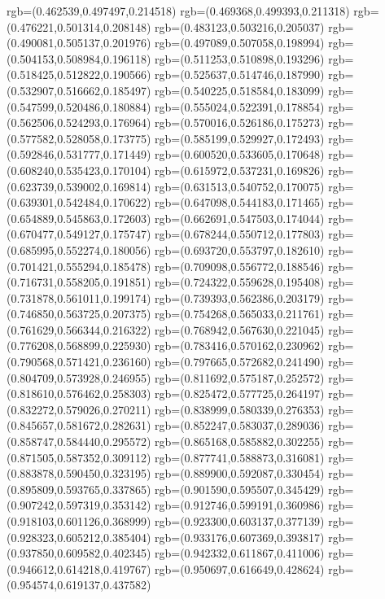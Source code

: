 {{{			rgb=(0.462539,0.497497,0.214518)
			rgb=(0.469368,0.499393,0.211318)
			rgb=(0.476221,0.501314,0.208148)
			rgb=(0.483123,0.503216,0.205037)
			rgb=(0.490081,0.505137,0.201976)
			rgb=(0.497089,0.507058,0.198994)
			rgb=(0.504153,0.508984,0.196118)
			rgb=(0.511253,0.510898,0.193296)
			rgb=(0.518425,0.512822,0.190566)
			rgb=(0.525637,0.514746,0.187990)
			rgb=(0.532907,0.516662,0.185497)
			rgb=(0.540225,0.518584,0.183099)
			rgb=(0.547599,0.520486,0.180884)
			rgb=(0.555024,0.522391,0.178854)
			rgb=(0.562506,0.524293,0.176964)
			rgb=(0.570016,0.526186,0.175273)
			rgb=(0.577582,0.528058,0.173775)
			rgb=(0.585199,0.529927,0.172493)
			rgb=(0.592846,0.531777,0.171449)
			rgb=(0.600520,0.533605,0.170648)
			rgb=(0.608240,0.535423,0.170104)
			rgb=(0.615972,0.537231,0.169826)
			rgb=(0.623739,0.539002,0.169814)
			rgb=(0.631513,0.540752,0.170075)
			rgb=(0.639301,0.542484,0.170622)
			rgb=(0.647098,0.544183,0.171465)
			rgb=(0.654889,0.545863,0.172603)
			rgb=(0.662691,0.547503,0.174044)
			rgb=(0.670477,0.549127,0.175747)
			rgb=(0.678244,0.550712,0.177803)
			rgb=(0.685995,0.552274,0.180056)
			rgb=(0.693720,0.553797,0.182610)
			rgb=(0.701421,0.555294,0.185478)
			rgb=(0.709098,0.556772,0.188546)
			rgb=(0.716731,0.558205,0.191851)
			rgb=(0.724322,0.559628,0.195408)
			rgb=(0.731878,0.561011,0.199174)
			rgb=(0.739393,0.562386,0.203179)
			rgb=(0.746850,0.563725,0.207375)
			rgb=(0.754268,0.565033,0.211761)
			rgb=(0.761629,0.566344,0.216322)
			rgb=(0.768942,0.567630,0.221045)
			rgb=(0.776208,0.568899,0.225930)
			rgb=(0.783416,0.570162,0.230962)
			rgb=(0.790568,0.571421,0.236160)
			rgb=(0.797665,0.572682,0.241490)
			rgb=(0.804709,0.573928,0.246955)
			rgb=(0.811692,0.575187,0.252572)
			rgb=(0.818610,0.576462,0.258303)
			rgb=(0.825472,0.577725,0.264197)
			rgb=(0.832272,0.579026,0.270211)
			rgb=(0.838999,0.580339,0.276353)
			rgb=(0.845657,0.581672,0.282631)
			rgb=(0.852247,0.583037,0.289036)
			rgb=(0.858747,0.584440,0.295572)
			rgb=(0.865168,0.585882,0.302255)
			rgb=(0.871505,0.587352,0.309112)
			rgb=(0.877741,0.588873,0.316081)
			rgb=(0.883878,0.590450,0.323195)
			rgb=(0.889900,0.592087,0.330454)
			rgb=(0.895809,0.593765,0.337865)
			rgb=(0.901590,0.595507,0.345429)
			rgb=(0.907242,0.597319,0.353142)
			rgb=(0.912746,0.599191,0.360986)
			rgb=(0.918103,0.601126,0.368999)
			rgb=(0.923300,0.603137,0.377139)
			rgb=(0.928323,0.605212,0.385404)
			rgb=(0.933176,0.607369,0.393817)
			rgb=(0.937850,0.609582,0.402345)
			rgb=(0.942332,0.611867,0.411006)
			rgb=(0.946612,0.614218,0.419767)
			rgb=(0.950697,0.616649,0.428624)
			rgb=(0.954574,0.619137,0.437582)
}}}
